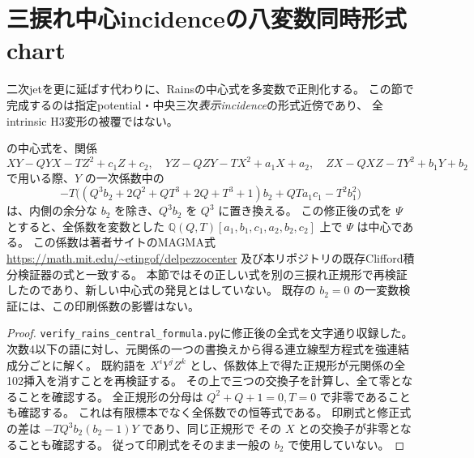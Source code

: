\section{三捩れ中心incidenceの八変数同時形式chart}
\label{sec:multivariate-formal-chart}
二次jetを更に延ばす代わりに、Rainsの中心式を多変数で正則化する。
この節で完成するのは指定potential・中央三次\emph{表示incidence}の形式近傍であり、
全intrinsic H3変形の被覆ではない。

\begin{lemma}[Rains式の印刷係数と独立検証]\label{lem:rains-corrected}
\cite[Appendix9.1, p.35]{EG}の中心式を、関係
\[
 XY-QYX-TZ^2+c_1Z+c_2,\quad
 YZ-QZY-TX^2+a_1X+a_2,\quad
 ZX-QXZ-TY^2+b_1Y+b_2
\]
で用いる際、$Y$ の一次係数中の
\[
 -T\bigl((Q^3b_2+2Q^2+QT^3+2Q+T^3+1)b_2
               +QT a_1c_1-T^2b_1^2\bigr)
\]
は、内側の余分な $b_2$ を除き、$Q^3b_2$ を $Q^3$ に置き換える。
この修正後の式を $\Psi$ とすると、全係数を変数とした
$\mathbb Q(Q,T)[a_1,b_1,c_1,a_2,b_2,c_2]$ 上で $\Psi$ は中心である。
この係数は著者サイトのMAGMA式
\url{https://math.mit.edu/~etingof/delpezzocenter}
及び本リポジトリの既存Clifford積分検証器の式と一致する。
本節ではその正しい式を別の三捩れ正規形で再検証したのであり、新しい中心式の発見とはしていない。
既存の $b_2=0$ の一変数検証には、この印刷係数の影響はない。
\end{lemma}
\begin{proof}
\texttt{verify\_rains\_central\_formula.py}に修正後の全式を文字通り収録した。
次数4以下の語に対し、元関係の一つの書換えから得る連立線型方程式を強連結成分ごとに解く。
既約語を $X^iY^jZ^k$ とし、係数体上で得た正規形が元関係の全102挿入を消すことを再検証する。
その上で三つの交換子を計算し、全て零となることを確認する。
全正規形の分母は $Q^2+Q+1=0,T=0$ で非零であることも確認する。
これは有限標本でなく全係数での恒等式である。
印刷式と修正式の差は $-TQ^3b_2(b_2-1)Y$ であり、同じ正規形で
その $X$ との交換子が非零となることも確認する。
従って印刷式をそのまま一般の $b_2$ で使用していない。
\end{proof}

